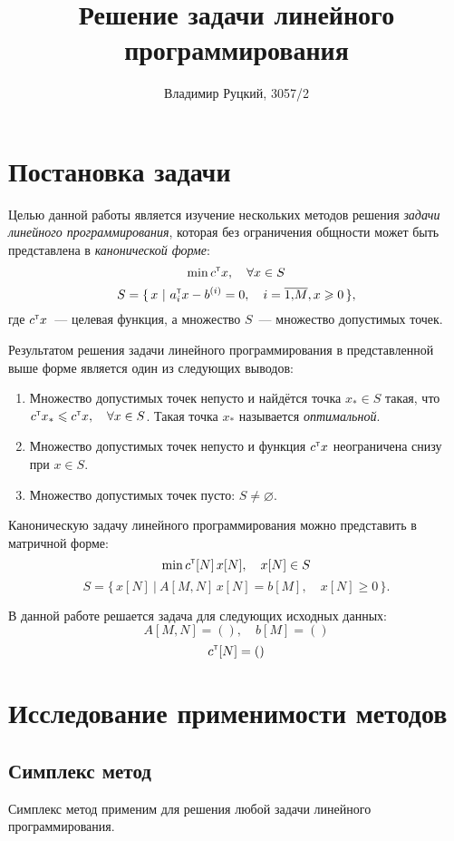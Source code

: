 \documentclass[10pt,a4paper,titlepage]{article}
\title{Решение задачи линейного программирования}
\author{Владимир Руцкий, 3057/2}
\newcommand\T{^\mathrm{\textsf{\tiny{T}}}}
\begin{document}
\maketitle
\thispagestyle{empty}

\section{Постановка задачи}
Целью данной работы является изучение нескольких методов решения \textit{задачи линейного программирования}, 
которая без ограничения общности может быть представлена в \textit{канонической форме}:
$$ \min c\T x, \quad \forall x \in S $$
$$ S = \{ \, x\ |\ a_i\T x - b^{(i)} = 0, \quad i = \overline{1,\!M}, x \geqslant 0 \, \},$$
где $c\T x$~--- целевая функция, а множество $S$~--- множество допустимых точек.

Результатом решения задачи линейного программирования в представленной выше форме является один из следующих выводов:
\begin{enumerate}
  \item Множество допустимых точек непусто и найдётся точка $x_* \in S$ такая, что $c\T x_* \leqslant c\T x, \quad \forall x \in S$. 
Такая точка $x_*$ называется \textit{оптимальной}.
  \item Множество допустимых точек непусто и функция $c\T x$ неограничена снизу при $x \in S$.
  \item Множество допустимых точек пусто: $S \ne \varnothing$.
\end{enumerate}

Каноническую задачу линейного программирования можно представить в матричной форме:
$$ \min c\T[N] \, x[N], \quad x[N] \in S $$
$$ S = \{ \, x[N]\ |\ A[M,N] \, x[N] = b[M], \quad x[N] \geqslant 0 \, \}.$$

В данной работе решается задача для следующих исходных данных:
$$A[M,N] = \left(  \right), \quad
b[M] = \left(  \right)$$
$$c\T[N] = \left(  \right)$$

\section{Исследование применимости методов}

\subsection{Симплекс метод} %
Симплекс метод применим для решения любой задачи линейного программирования.
\end{document}
